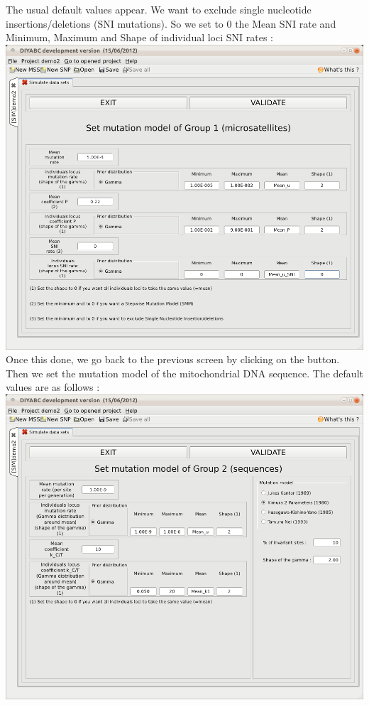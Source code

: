 The usual default values appear. We want to exclude single nucleotide insertions/deletions (SNI mutations). So we set to 0 the Mean SNI rate and Minimum, Maximum and Shape of individual loci SNI rates :\\

\includegraphics[scale=0.33]{gui_pictures/Capture-DIYABC-81.png} \\

Once this done, we go back to the previous screen by clicking on the  button. Then we set the mutation model of the mitochondrial DNA sequence. The default values are as follows :\\

\includegraphics[scale=0.33]{gui_pictures/Capture-DIYABC-82.png} \\

